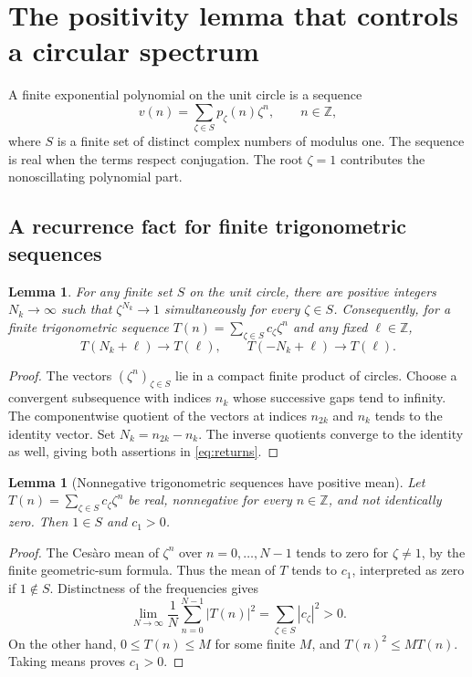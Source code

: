 \documentclass[11pt,letterpaper]{article}
\newtheorem{lemma}[theorem]{Lemma}
\theoremstyle{definition}
\theoremstyle{remark}
\newcommand{\Z}{\mathbb Z}
\begin{document}
\section{The positivity lemma that controls a circular spectrum}
\label{sec:positivity}

A finite exponential polynomial on the unit circle is a sequence
\begin{equation}
  v(n)=\sum_{\zeta\in S}p_\zeta(n)\zeta^n,
  \qquad n\in\Z,
  \label{eq:unitexp}
\end{equation}
where $S$ is a finite set of distinct complex numbers of modulus one.
The sequence is real when the terms respect conjugation.
The root $\zeta=1$ contributes the nonoscillating polynomial part.

\subsection{A recurrence fact for finite trigonometric sequences}

\begin{lemma}
\label{lem:returns}
For any finite set $S$ on the unit circle, there are positive integers
$N_k\to\infty$ such that $\zeta^{N_k}\to1$ simultaneously for every
$\zeta\in S$. Consequently, for a finite trigonometric sequence
$T(n)=\sum_{\zeta\in S}c_\zeta\zeta^n$ and any fixed $\ell\in\Z$,
\begin{equation}
  T(N_k+\ell)\to T(\ell),\qquad
  T(-N_k+\ell)\to T(\ell).
  \label{eq:returns}
\end{equation}
\end{lemma}

\begin{proof}
The vectors $(\zeta^n)_{\zeta\in S}$ lie in a compact finite product of
circles. Choose a convergent subsequence with indices $n_k$ whose
successive gaps tend to infinity. The componentwise quotient of the
vectors at indices $n_{2k}$ and $n_k$ tends to the identity vector.
Set $N_k=n_{2k}-n_k$. The inverse quotients converge to the identity as
well, giving both assertions in \eqref{eq:returns}.
\end{proof}

\begin{lemma}[Nonnegative trigonometric sequences have positive mean]
\label{lem:mean}
Let $T(n)=\sum_{\zeta\in S}c_\zeta\zeta^n$ be real, nonnegative for every
$n\in\Z$, and not identically zero. Then $1\in S$ and $c_1>0$.
\end{lemma}

\begin{proof}
The Ces\`aro mean of $\zeta^n$ over $n=0,\ldots,N-1$ tends to zero for
$\zeta\ne1$, by the finite geometric-sum formula. Thus the mean of $T$
tends to $c_1$, interpreted as zero if $1\notin S$. Distinctness of the
frequencies gives
\begin{equation}
 \lim_{N\to\infty}\frac1N\sum_{n=0}^{N-1}|T(n)|^2
    =\sum_{\zeta\in S}|c_\zeta|^2>0.
\end{equation}
On the other hand, $0\le T(n)\le M$ for some finite $M$, and
$T(n)^2\le MT(n)$. Taking means proves $c_1>0$.
\end{proof}
\end{document}
